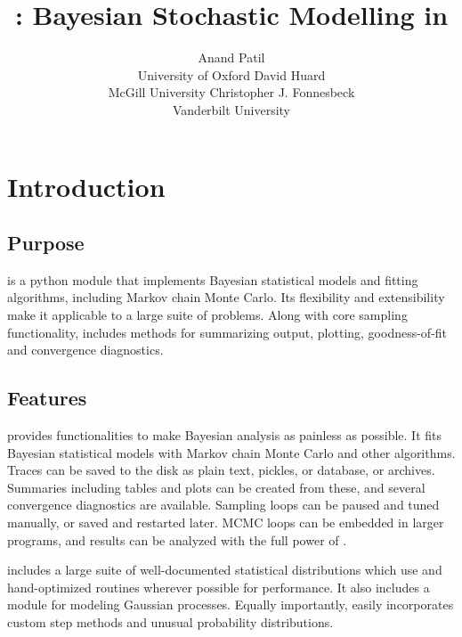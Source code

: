\documentclass[]{jss}
\author{Anand Patil\\University of Oxford \And
        David Huard\\McGill University  \And
		Christopher J. Fonnesbeck\\Vanderbilt University}
\title{\pkg{PyMC} : Bayesian Stochastic Modelling in \proglang{Python}}
\begin{document}
\maketitle


\section[Introduction]{Introduction}
\label{chap:intro}


\subsection{Purpose}
\label{purpose}

 is a python module that implements Bayesian statistical models and
fitting algorithms, including Markov chain Monte Carlo.
Its flexibility and extensibility make it applicable to a large suite of problems. Along with core sampling functionality,  includes
methods for summarizing output, plotting, goodness-of-fit and convergence
diagnostics.


\subsection{Features}
\label{features}

 provides functionalities to make Bayesian analysis as painless as
possible. It fits Bayesian statistical models with Markov chain Monte Carlo and
other algorithms. Traces can be saved to the disk as plain text,  pickles,  \citep{sqlite} or  \citep{mysql} 
database, or  \citep{hdf5}  archives. Summaries including tables and plots can be created from these, and several convergence diagnostics are available. Sampling loops can be paused and tuned manually, or saved and restarted later. MCMC loops can be embedded in larger programs, and results can be analyzed
with the full power of .


 includes a large suite of well-documented statistical distributions which use  \citep{numpy}  and hand-optimized  routines wherever possible for performance. It also includes a module for modeling Gaussian processes. Equally importantly, easily incorporates custom step methods and unusual probability
distributions.
\end{document}
